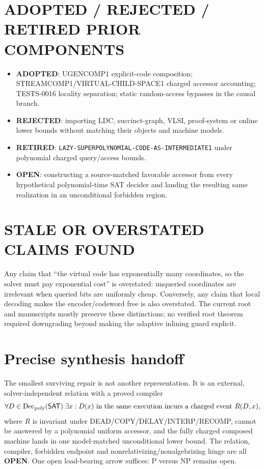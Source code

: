 \documentclass[11pt]{article}
\newcommand{\SAT}{\mathsf{SAT}}
\newcommand{\OPEN}{\textbf{OPEN}}
\begin{document}
\section{ADOPTED / REJECTED / RETIRED PRIOR COMPONENTS}
\begin{itemize}
\item \textbf{ADOPTED}: UGENCOMP1 explicit-code composition;
STREAMCOMP1/VIRTUAL-CHILD-SPACE1 charged accessor accounting; TESTS-0016
locality separation; static random-access bypasses in the causal branch.
\item \textbf{REJECTED}: importing LDC, succinct-graph, VLSI, proof-system or
online lower bounds without matching their objects and machine models.
\item \textbf{RETIRED}: \texttt{LAZY-SUPERPOLYNOMIAL-CODE-AS-INTERMEDIATE1}
under polynomial charged query/access bounds.
\item \textbf{OPEN}: constructing a source-matched favorable accessor from
every hypothetical polynomial-time SAT decider and landing the resulting
same realization in an unconditional forbidden region.
\end{itemize}

\section{STALE OR OVERSTATED CLAIMS FOUND}
Any claim that ``the virtual code has exponentially many coordinates, so the
solver must pay exponential cost'' is overstated: unqueried coordinates are
irrelevant when queried bits are uniformly cheap.  Conversely, any claim
that local decoding makes the encoder/codeword free is also overstated.  The
current root and manuscripts mostly preserve these distinctions; no verified
root theorem required downgrading beyond making the adaptive inlining guard
explicit.

\section{Precise synthesis handoff}
The smallest surviving repair is not another representation.  It is an
external, solver-independent relation with a proved compiler
\[
\forall D\in\mathrm{Dec}_{\rm poly}(\SAT)\;\exists x:
D(x)\text{ in the same execution incurs a charged event }R(D,x),
\]
where $R$ is invariant under DEAD/COPY/DELAY/INTERP/RECOMP, cannot be answered
by a polynomial uniform accessor, and the fully charged composed machine
lands in one model-matched unconditional lower bound.  The relation,
compiler, forbidden endpoint and nonrelativizing/nonalgebrizing hinge are all
\OPEN.  One open load-bearing arrow suffices: P versus NP remains open.
\end{document}
